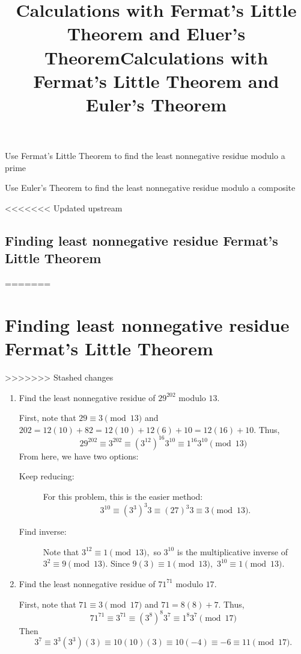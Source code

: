 \documentclass{ximera}
\title{Calculations with Fermat's Little Theorem and Eluer's Theorem}
\title{Calculations with Fermat's Little Theorem and Euler's Theorem}
\begin{document}
\begin{abstract}
\end{abstract}
\maketitle


\begin{obj}
  \item Use Fermat's Little Theorem to find the least nonnegative residue modulo a prime
  \item Use Euler's Theorem to find the least nonnegative residue modulo a composite
\end{obj}


<<<<<<< Updated upstream
\subsection*{Finding least nonnegative residue Fermat's Little Theorem}
=======
\section{Finding least nonnegative residue Fermat's Little Theorem}
>>>>>>> Stashed changes
\begin{example}
  \begin{enumerate}
    \item  Find the least nonnegative residue of $29^{202}$ modulo $13$. 
    
    First, note that $29\equiv 3\pmod{13}$ and $202=12(10)+82=12(10)+12(6)+10=12(16)+10.$  Thus,
    \[29^{202}\equiv3^{202}\equiv (3^{12})^{16}  3^{10}\equiv 1^{16} 3^{10}\pmod{13}\]
    From here,  we have two  options: 
    \begin{description}
      \item[Keep reducing:] For this problem, this is the easier method: 
        \[3^{10}\equiv (3^3)^3 3\equiv (27)^3 3\equiv 3\pmod{13}.\]
      \item[Find inverse:] Note that $3^{12}\equiv 1\pmod{13},$ so $3^{10}$ is the multiplicative inverse of $3^2\equiv 9\pmod{13}.$ Since $9(3)\equiv 1\pmod{13},$ $3^{10}\equiv 1\pmod{13}.$
    \end{description}

    \item Find the least nonnegative residue of $71^{71}$ modulo $17$. 

    First, note that $71\equiv 3\pmod{17}$ and $71=8(8)+7.$  Thus,
    \[71^{71}\equiv3^{71}\equiv (3^{8})^{8}  3^{7}\equiv 1^{8} 3^{7}\pmod{17}\]
    Then \[3^7\equiv 3^{3}(3^3)(3)\equiv 10(10)(3)\equiv 10(-4)\equiv -6\equiv 11\pmod{17}.\]
  \end{enumerate}
\end{example}
\end{document}
